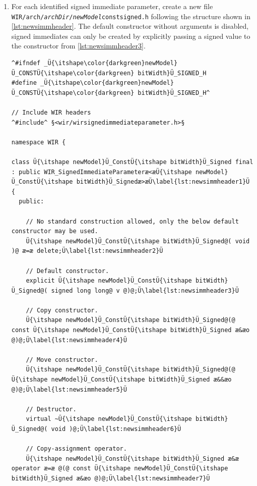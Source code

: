 \begin{enumerate}[resume]
  \item For each identified signed immediate parameter, create a new file \texttt{WIR/arch/{\itshape archDir}/{\itshape newModel}constsigned.h} following the structure shown in \cref{lst:newsimmheader}.\label{enum:newsimmhead}
  The default constructor without arguments is disabled, signed immediates can only be created by explicitly passing a signed value to the constructor from \cref{lst:newsimmheader3}.

\begin{lstlisting}[style=code,float=!t,caption={Header File for a New Signed Immediate Parameter's Class},label=lst:newsimmheader]
^#ifndef _Ü{\itshape\color{darkgreen}newModel}Ü_CONSTÜ{\itshape\color{darkgreen} bitWidth}Ü_SIGNED_H
#define _Ü{\itshape\color{darkgreen}newModel}Ü_CONSTÜ{\itshape\color{darkgreen} bitWidth}Ü_SIGNED_H^

// Include WIR headers
^#include^ §<wir/wirsignedimmediateparameter.h>§

namespace WIR {

class Ü{\itshape newModel}Ü_ConstÜ{\itshape bitWidth}Ü_Signed final : public WIR_SignedImmediateParameteræ<æÜ{\itshape newModel}Ü_ConstÜ{\itshape bitWidth}Ü_Signedæ>æÜ\label{lst:newsimmheader1}Ü
{
  public:

    // No standard construction allowed, only the below default constructor may be used.
    Ü{\itshape newModel}Ü_ConstÜ{\itshape bitWidth}Ü_Signed@( void )@ æ=æ delete;Ü\label{lst:newsimmheader2}Ü

    // Default constructor.
    explicit Ü{\itshape newModel}Ü_ConstÜ{\itshape bitWidth}Ü_Signed@( signed long long@ v @)@;Ü\label{lst:newsimmheader3}Ü

    // Copy constructor.
    Ü{\itshape newModel}Ü_ConstÜ{\itshape bitWidth}Ü_Signed@(@ const Ü{\itshape newModel}Ü_ConstÜ{\itshape bitWidth}Ü_Signed æ&æo @)@;Ü\label{lst:newsimmheader4}Ü

    // Move constructor.
    Ü{\itshape newModel}Ü_ConstÜ{\itshape bitWidth}Ü_Signed@(@ Ü{\itshape newModel}Ü_ConstÜ{\itshape bitWidth}Ü_Signed æ&&æo @)@;Ü\label{lst:newsimmheader5}Ü

    // Destructor.
    virtual ~Ü{\itshape newModel}Ü_ConstÜ{\itshape bitWidth}Ü_Signed@( void )@;Ü\label{lst:newsimmheader6}Ü

    // Copy-assignment operator.
    Ü{\itshape newModel}Ü_ConstÜ{\itshape bitWidth}Ü_Signed æ&æ operator æ=æ @(@ const Ü{\itshape newModel}Ü_ConstÜ{\itshape bitWidth}Ü_Signed æ&æo @)@;Ü\label{lst:newsimmheader7}Ü


\end{lstlisting}
\end{enumerate}
